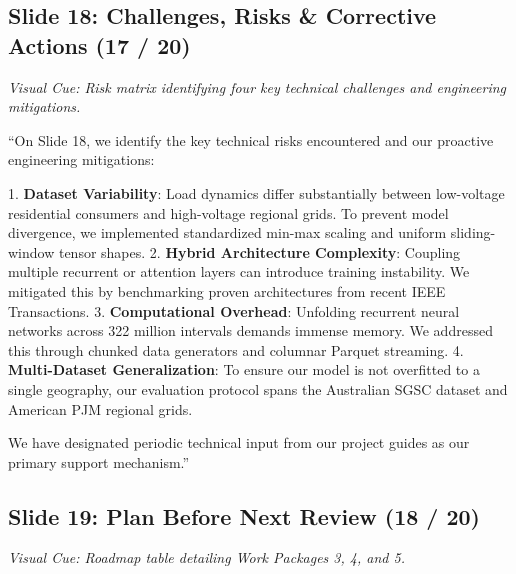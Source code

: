 \documentclass[11pt,a4paper]{article}
\begin{document}
\subsection{Slide 18: Challenges, Risks \& Corrective Actions (17 / 20)}
\textit{Visual Cue: Risk matrix identifying four key technical challenges and engineering mitigations.}

\begin{scriptbox}
``On Slide 18, we identify the key technical risks encountered and our proactive engineering mitigations:

1. \textbf{Dataset Variability}: Load dynamics differ substantially between low-voltage residential consumers and high-voltage regional grids. To prevent model divergence, we implemented standardized min-max scaling and uniform sliding-window tensor shapes.
2. \textbf{Hybrid Architecture Complexity}: Coupling multiple recurrent or attention layers can introduce training instability. We mitigated this by benchmarking proven architectures from recent IEEE Transactions.
3. \textbf{Computational Overhead}: Unfolding recurrent neural networks across 322 million intervals demands immense memory. We addressed this through chunked data generators and columnar Parquet streaming.
4. \textbf{Multi-Dataset Generalization}: To ensure our model is not overfitted to a single geography, our evaluation protocol spans the Australian SGSC dataset and American PJM regional grids.

We have designated periodic technical input from our project guides as our primary support mechanism.''
\end{scriptbox}

\subsection{Slide 19: Plan Before Next Review (18 / 20)}
\textit{Visual Cue: Roadmap table detailing Work Packages 3, 4, and 5.}
\end{document}
